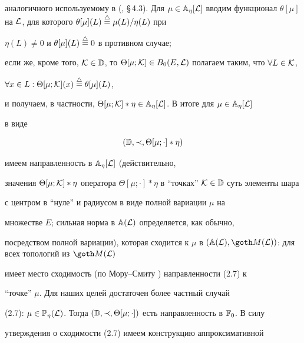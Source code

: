 аналогичного используемому в (\cite{Ch1}, \S\,4.3). Для $\mu \in


{\Bbb A}_\eta[{\cal L}]$ вводим функционал $\theta[\mu]$ на ${\cal


L}$, для которого $\theta[\mu](L) \stac \mu(L) / \eta(L)$ при


$\eta(L) \ne 0$ и $\theta[\mu](L) \overset{\triangle}{=} 0$ в противном случае;


если же, кроме того, ${\cal K} \in {\Bbb D}$, то $\Theta[\mu; {\cal


K}] \in B_0\eL$ полагаем таким, что $\forall L \in {\cal K}$,


$\forall x \in L: \Theta[\mu; {\cal K}](x) \overset{\triangle}{=} \theta[\mu](L)$,


и получаем, в частности, $\Theta[\mu; {\cal K}] * \eta \in {\Bbb


A}_\eta[{\cal L}]$. В итоге для $\mu \in {\Bbb A}_\eta[{\cal L}]$


в виде


%


\begin{equation}


({\Bbb D}, \prec, \Theta[\mu; \cdot] * \eta)


\end{equation}


%


имеем направленность в ${\Bbb A}_\eta[{\cal L}]$ (действительно,


значения $\Theta[\mu; {\cal K}] * \eta$ оператора $\Theta[\mu;


\cdot] * \eta$ в ``точках'' ${\cal K} \in {\Bbb D}$ суть элементы шара


с центром в ``нуле'' и радиусом в виде полной вариации $\mu$ на


множестве $E$; сильная норма в ${\Bbb A}({\cal L})$ определяется, как обычно,


посредством полной вариации), которая сходится к $\mu$ в $(\AL,


{\goth M}({\cal L}))$: для всех топологий из ${\goth M}({\cal L})$


имеет место сходимость (по Мору--Смиту \cite{Kel}) направленности (2.7) к


``точке'' $\mu$. Для наших целей достаточен более частный случай


(2.7): $\mu \in {\Bbb P}_\eta({\cal L})$. Тогда $({\Bbb D}, \prec,


\Theta[\mu; \cdot])$ есть направленность в ${\Bbb F}_0$. В силу


утверждения о сходимости (2.7) имеем конструкцию аппроксимативной



